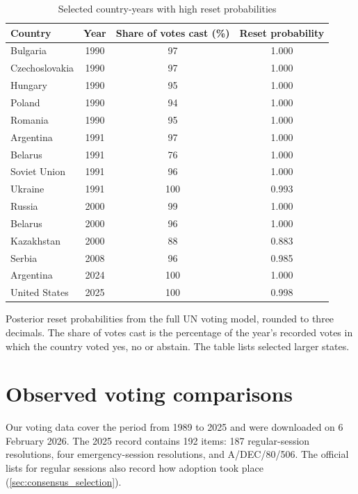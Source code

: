 \documentclass[10pt,authoryear]{elsarticle}
\begin{document}
\begin{table}[!ht]
\centering
\caption{Selected country-years with high reset probabilities}
\label{tab:known-breaks}
\small
\begin{tabular}{lccc}
\toprule
Country & Year & Share of votes cast (\%) & Reset probability \\
\midrule
Bulgaria & 1990 & 97 & 1.000 \\
Czechoslovakia & 1990 & 97 & 1.000 \\
Hungary & 1990 & 95 & 1.000 \\
Poland & 1990 & 94 & 1.000 \\
Romania & 1990 & 95 & 1.000 \\
Argentina & 1991 & 97 & 1.000 \\
Belarus & 1991 & 76 & 1.000 \\
Soviet Union & 1991 & 96 & 1.000 \\
Ukraine & 1991 & 100 & 0.993 \\
Russia & 2000 & 99 & 1.000 \\
Belarus & 2000 & 96 & 1.000 \\
Kazakhstan & 2000 & 88 & 0.883 \\
Serbia & 2008 & 96 & 0.985 \\
Argentina & 2024 & 100 & 1.000 \\
United States & 2025 & 100 & 0.998 \\
\bottomrule
\end{tabular}
\begin{minipage}{.80\textwidth}\footnotesize Posterior reset probabilities from the full UN voting model, rounded to three decimals. The share of votes cast is the percentage of the year's recorded votes in which the country voted yes, no or abstain. The table lists selected larger states.\end{minipage}
\end{table}
\FloatBarrier

\section{Observed voting comparisons}
\label{sec:observed-votes}

Our voting data cover the period from 1989 to 2025 and were downloaded on 6 February 2026. The 2025 record contains 192 items: 187 regular-session resolutions, four emergency-session resolutions, and A/DEC/80/506. The official lists for regular sessions also record how adoption took place (\ref{sec:consensus_selection}).
\end{document}
